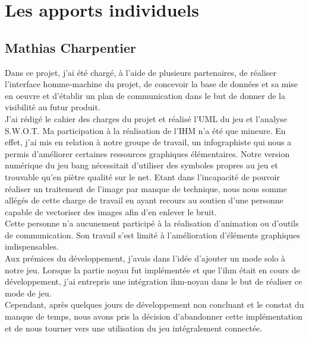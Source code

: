 \documentclass[a4paper,11pt]{article}
\begin{document}
\newpage

\section{Les apports individuels}



\subsection{Mathias Charpentier}


Dans ce projet, j’ai été chargé, à l’aide de plusieurs partenaires, de réaliser l’interface homme-machine du projet, de concevoir la base de données et sa mise en oeuvre et d’établir un plan de communication dans le but de donner de la visibilité au futur produit. \\

J’ai rédigé le cahier des charges du projet et réalisé l’UML du jeu et l’analyse S.W.O.T.
Ma participation à la réalisation de l’IHM n’a été que mineure. En effet, j’ai mis en relation à notre groupe de travail, un infographiste qui nous a permis d’améliorer certaines ressources graphiques élémentaires.
 Notre version numérique du jeu bang nécessitait d’utiliser des symboles propres au jeu et trouvable qu’en piètre qualité sur le net. Etant dans l’incapacité de pouvoir réaliser un traitement de l’image par manque de technique, nous nous somme allégés de cette charge de travail en ayant recours au soutien d’une personne capable de vectoriser des images afin d’en enlever le bruit. \\
 
Cette personne n’a aucunement participé à la réalisation d’animation ou d’outils de communication. Son travail s’est limité à l’amélioration d’éléments graphiques indispensables. \\

Aux prémices du développement, j’avais dans l’idée d’ajouter un mode solo à notre jeu. Lorsque la partie noyau fut implémentée et que l’ihm était en cours de développement, j’ai entrepris une intégration ihm-noyau dans le but de réaliser ce mode de jeu. \\

Cependant, après quelques jours de développement non concluant et le constat du manque de temps, nous avons pris la décision d’abandonner cette implémentation et de nous tourner vers une utilisation du jeu intégralement connectée. \\ 
\end{document}
